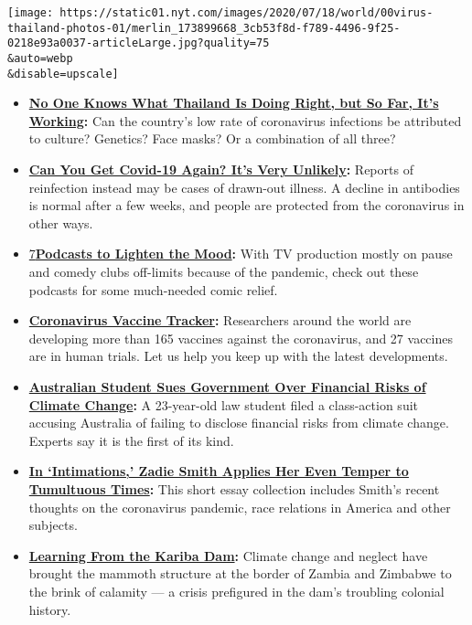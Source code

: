 \texttt{[image: https://static01.nyt.com/images/2020/07/18/world/00virus-thailand-photos-01/merlin\_173899668\_3cb53f8d-f789-4496-9f25-0218e93a0037-articleLarge.jpg?quality=75\\\&auto=webp\\\&disable=upscale]}

\begin{itemize}
\item
  \textbf{\href{https://www.nytimes.com/2020/07/16/world/asia/coronavirus-thailand-photos.html}{No
  One Knows What Thailand Is Doing Right, but So Far, It's Working}:}
  Can the country's low rate of coronavirus infections be attributed to
  culture? Genetics? Face masks? Or a combination of all three?
\item
  \textbf{\href{https://www.nytimes.com/2020/07/22/health/covid-antibodies-herd-immunity.html}{Can
  You Get Covid-19 Again? It's Very Unlikely}:} Reports of reinfection
  instead may be cases of drawn-out illness. A decline in antibodies is
  normal after a few weeks, and people are protected from the
  coronavirus in other ways.
\item
  \href{https://www.nytimes.com/2020/07/22/arts/comedy-funny-podcasts.html}{7}\textbf{\href{https://www.nytimes.com/2020/07/22/arts/comedy-funny-podcasts.html}{Podcasts
  to Lighten the Mood}:} With TV production mostly on pause and comedy
  clubs off-limits because of the pandemic, check out these podcasts for
  some much-needed comic relief.
\item
  \textbf{\href{https://www.nytimes.com/interactive/2020/science/coronavirus-vaccine-tracker.html}{Coronavirus
  Vaccine Tracker}:} Researchers around the world are developing more
  than 165 vaccines against the coronavirus, and 27 vaccines are in
  human trials. Let us help you keep up with the latest developments.
\item
  \textbf{\href{https://www.nytimes.com/2020/07/23/world/australia/lawsuit-climate-change-bonds.html}{Australian
  Student Sues Government Over Financial Risks of Climate Change}:} A
  23-year-old law student filed a class-action suit accusing Australia
  of failing to disclose financial risks from climate change. Experts
  say it is the first of its kind.
\item
  \textbf{\href{https://www.nytimes.com/2020/07/22/books/review-intimations-essays-zadie-smith.html}{In
  `Intimations,' Zadie Smith Applies Her Even Temper to Tumultuous
  Times}:} This short essay collection includes Smith's recent thoughts
  on the coronavirus pandemic, race relations in America and other
  subjects.
\item
  \textbf{\href{https://www.nytimes.com/interactive/2020/07/22/magazine/zambia-kariba-dam.html}{Learning
  From the Kariba Dam}:} Climate change and neglect have brought the
  mammoth structure at the border of Zambia and Zimbabwe to the brink of
  calamity --- a crisis prefigured in the dam's troubling colonial
  history.
\end{itemize}

